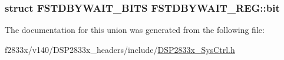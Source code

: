 \subsubsection[{bit}]{\setlength{\rightskip}{0pt plus 5cm}struct {\bf F\+S\+T\+D\+B\+Y\+W\+A\+I\+T\+\_\+\+B\+I\+T\+S} F\+S\+T\+D\+B\+Y\+W\+A\+I\+T\+\_\+\+R\+E\+G\+::bit}\label{union_f_s_t_d_b_y_w_a_i_t___r_e_g_a9373cc0e11fbfed38c003b846dac753f}


The documentation for this union was generated from the following file\+:\begin{DoxyCompactItemize}
\item 
f2833x/v140/\+D\+S\+P2833x\+\_\+headers/include/\hyperlink{_d_s_p2833x___sys_ctrl_8h}{D\+S\+P2833x\+\_\+\+Sys\+Ctrl.\+h}\end{DoxyCompactItemize}
